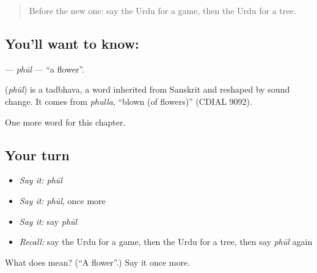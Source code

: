 \label{lesson:UR-C63-phul}



\begin{quote}
Before the new one: say the Urdu for a game, then the Urdu for a tree.
\end{quote}

\subsection*{You'll want to know: }
\textbf{} — \emph{phūl} — \textquotedblleft{}a flower\textquotedblright{}.

\begin{cousinweb}
\textbf{} (\emph{phūl}) is a tadbhava, a word inherited from Sanskrit and reshaped by sound change. It comes from \emph{phulla}, \textquotedblleft{}blown (of flowers)\textquotedblright{} (CDIAL 9092).
\end{cousinweb}

\begin{grammarlens}[title={What you've built}]
One more word for this chapter.
\end{grammarlens}

\subsection*{Your turn}
\begin{itemize}
\raggedright
  \item \emph{Say it:} \emph{phūl}
  \item \emph{Say it:} \emph{phūl}, once more
  \item \emph{Say it:} say \emph{phūl}
  \item \emph{Recall:} say the Urdu for a game, then the Urdu for a tree, then say \emph{phūl} again
\end{itemize}

\begin{tcolorbox}[breakable,colback=teal!4,colframe=teal!35!black,title={Before you move on}]
What does  mean? (\textquotedblleft{}A flower\textquotedblright{}.) Say it once more.
\end{tcolorbox}
